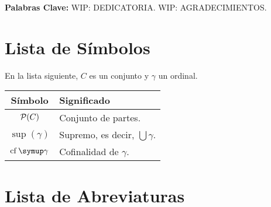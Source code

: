 \vspace{\fill}

\textbf{Palabras Clave:}
\fi
\ifdedicatoria\newpage
WIP: DEDICATORIA.
\fi
\ifagradecimientos\newpage
WIP: AGRADECIMIENTOS.
\fi
\iflistas
\chapter*{Lista de Símbolos}

En la lista siguiente, $C$ es un conjunto y $\gamma$ un ordinal.

\begin{center}
    \begin{tabular}{cl}
        Símbolo & Significado \\
        \hline\noalign{\smallskip}
        $\pwset{C}$ & Conjunto de partes.\\
        $\sup(\gamma)$ & Supremo, es decir, $\bigcup \gamma$.\\
        $\cf\gamma$ & Cofinalidad de $\gamma$.
    \end{tabular}
\end{center}

\newpage
\chapter*{Lista de Abreviaturas}

